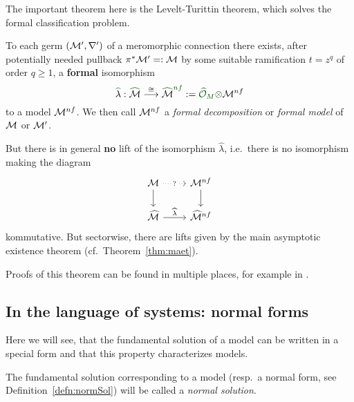 The important theorem here is the Levelt-Turittin theorem, which solves the
formal classification problem.
\begin{thm}\label{thm:leveltTurittin}
  To each germ $(\mathcal{M}',\nabla')$ of a meromorphic connection there exists, after
  potentially needed pullback $\pi^{*}\textcolor{black}{\mathcal{M}'}=:\mathcal{M}$ by some
  suitable ramification $t=z^q$ of order $q\geq1$, a
  \textcolor{green!30!black}{\textbf{formal}} isomorphism
  \[
    \textcolor{green!30!black}{\hat{\textcolor{black}{\lambda}}}:
    \textcolor{green!30!black}{\hat{\textcolor{black}{\cM}}}
    \overset{\cong}\longrightarrow
    \textcolor{green!30!black}{\hat{\textcolor{black}{\cM}}^{nf}}
    :=\textcolor{green!30!black}{\hat\cO_M\otimes}\cM^{nf}
  \]
  to a model $\mathcal{M}^{nf}$.
  We then call $\mathcal{M}^{nf}$ a \emph{formal decomposition} or \emph{formal model}
  of $\mathcal{M}$ or $\mathcal{M}'$.
  \begin{rem}
    But there is in general \textbf{no} lift of the isomorphism $\hat\lambda$,
    i.e.\ there is no isomorphism making the diagram
    \[ \begin{tikzcd}
        \cM \dar \arrow[dotted]{r}[description]{?} & \cM^{nf} \dar
        \\\hat\cM \rar{\hat\lambda} & \hat\cM^{nf}
    \end{tikzcd} \]
    kommutative.
    But sectorwise, there are lifts given by the main asymptotic existence
    theorem (cf.\ Theorem~\ref{thm:maet}).
  \end{rem}
\end{thm}
Proofs of this theorem can be found in multiple places, for example in
\cite[Thm.5.4.7]{sabbah_cimpa90}.


\subsection{In the language of systems: normal forms}\label{sec:normalForms}
Here we will see, that the fundamental solution of a model can be written in a
special form and that this property characterizes models.
\begin{defn}
  The fundamental solution corresponding to a model (resp.\ a normal form, see
  Definition~\ref{defn:normSol}) will be called a
  \emph{normal solution}.
\end{defn}

